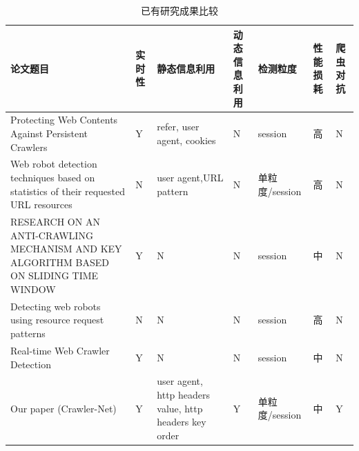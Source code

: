 \documentclass[doctor,privacy,twoside]{buaa_mac}
\begin{document}
\centerline{}
\begin{table}[h]
  \caption{已有研究成果比较}
  \label{tab:papercomponents}
  \centering
\begin{tabular}{|p{5cm}<{\centering}||p{1cm}<{\centering}|p{3cm}<{\centering}|p{1cm}<{\centering}|p{2cm}<{\centering}|p{1cm}<{\centering}|p{1cm}<{\centering}|}
    \hline
    论文题目                                                                                  & 实时性 & 静态信息利用                                                 & 动态信息利用 & 检测粒度        & 性能损耗 & 爬虫对抗 \\
    \hline
    Protecting Web Contents Against Persistent Crawlers                                   & Y   & refer, user agent, cookies                             & N      & session     & 高    & N    \\ 
    \hline
    Web robot detection techniques based on statistics of their requested URL resources   & N   & user agent,URL pattern                                 & N      & 单粒度/session & 高    & N    \\
    \hline
    RESEARCH ON AN ANTI-CRAWLING MECHANISM AND KEY ALGORITHM BASED ON SLIDING TIME WINDOW & Y   & N                                                      & N      & session     & 中    & N    \\ 
    \hline
    Detecting web robots using resource request patterns                                  & N   & N                                                      & N      & session     & 高    & N    \\
    \hline
    Real-time Web Crawler Detection                                                       & Y   & N                                                      & N      & session     & 中    & N    \\
    \hline
    Our paper (Crawler-Net)                                                               & Y   & user agent, http headers value, http headers key order & Y      & 单粒度/session & 中    & Y    \\
    \hline
    \end{tabular}
\end{table}
\centerline{}
\end{document}
